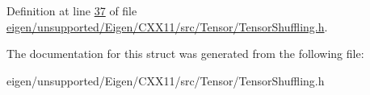Definition at line \hyperlink{eigen_2unsupported_2_eigen_2_c_x_x11_2src_2_tensor_2_tensor_shuffling_8h_source_l00037}{37} of file \hyperlink{eigen_2unsupported_2_eigen_2_c_x_x11_2src_2_tensor_2_tensor_shuffling_8h_source}{eigen/unsupported/\+Eigen/\+C\+X\+X11/src/\+Tensor/\+Tensor\+Shuffling.\+h}.



The documentation for this struct was generated from the following file\+:\begin{DoxyCompactItemize}
\item 
eigen/unsupported/\+Eigen/\+C\+X\+X11/src/\+Tensor/\+Tensor\+Shuffling.\+h\end{DoxyCompactItemize}
